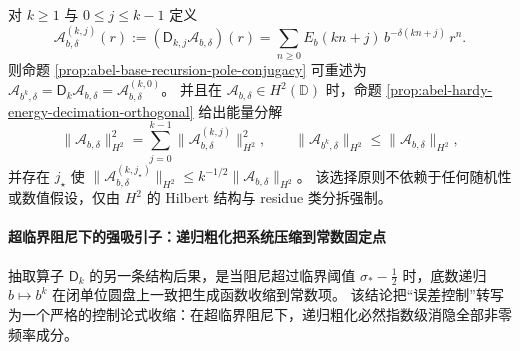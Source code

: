 \begin{remark}\label{rem:abel-hardy-energy-decimation-applied}
对 \(k\ge 1\) 与 \(0\le j\le k-1\) 定义
\[
\mathcal A_{b,\delta}^{(k,j)}(r):=(\mathsf D_{k,j}\mathcal A_{b,\delta})(r)
=\sum_{n\ge 0}E_b(kn+j)\,b^{-\delta(kn+j)}\,r^n.
\]
则命题 \ref{prop:abel-base-recursion-pole-conjugacy} 可重述为
\(
\mathcal A_{b^k,\delta}=\mathsf D_k\mathcal A_{b,\delta}=\mathcal A_{b,\delta}^{(k,0)}
\)。
并且在 \(\mathcal A_{b,\delta}\in H^2(\mathbb D)\) 时，命题 \ref{prop:abel-hardy-energy-decimation-orthogonal} 给出能量分解
\[
\|\mathcal A_{b,\delta}\|_{H^2}^2=\sum_{j=0}^{k-1}\|\mathcal A_{b,\delta}^{(k,j)}\|_{H^2}^2,
\qquad
\|\mathcal A_{b^k,\delta}\|_{H^2}\le \|\mathcal A_{b,\delta}\|_{H^2},
\]
并存在 \(j_\star\) 使 \(\|\mathcal A_{b,\delta}^{(k,j_\star)}\|_{H^2}\le k^{-1/2}\|\mathcal A_{b,\delta}\|_{H^2}\)。
该选择原则不依赖于任何随机性或数值假设，仅由 \(H^2\) 的 Hilbert 结构与 residue 类分拆强制。
\end{remark}

\paragraph{超临界阻尼下的强吸引子：递归粗化把系统压缩到常数固定点}
抽取算子 \(\mathsf D_k\) 的另一条结构后果，是当阻尼超过临界阈值 \(\sigma_*-\tfrac12\) 时，底数递归 \(b\mapsto b^k\) 在闭单位圆盘上一致把生成函数收缩到常数项。
该结论把“误差控制”转写为一个严格的控制论式收缩：在超临界阻尼下，递归粗化必然指数级消隐全部非零频率成分。

